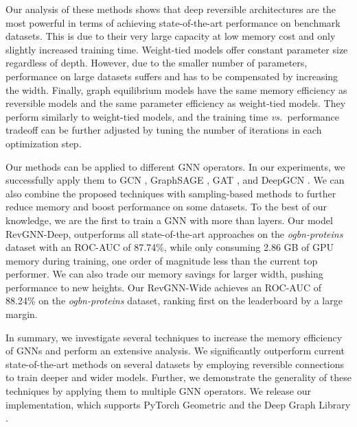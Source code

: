 \documentclass{article}
\newcommand{\vs}{\emph{vs.~}}
\begin{document}
Our analysis of these methods shows that deep reversible architectures are the most powerful in terms of achieving state-of-the-art performance on benchmark datasets. This is due to their very large capacity at low memory cost and only slightly increased training time. 
Weight-tied models offer constant parameter size regardless of depth.
However, due to the smaller number of parameters, performance on large datasets suffers and has to be compensated by increasing the width. Finally, graph equilibrium models have the same memory efficiency as reversible models and the same parameter efficiency as weight-tied models. They perform similarly to weight-tied models, and the training time \vs performance tradeoff can be further adjusted by tuning the number of iterations in each optimization step.

Our methods can be applied to different GNN operators. In our experiments, we successfully apply them to GCN \citep{kipf2017semi}, GraphSAGE \citep{hamilton2017inductive}, GAT \citep{veli2018gat}, and DeepGCN \citep{li2019deepgcns}. We can also combine the proposed techniques with sampling-based methods to further reduce memory and boost performance on some datasets.
To the best of our knowledge, we are the first to train a GNN with more than  layers. Our model RevGNN-Deep, outperforms all state-of-the-art approaches on the \emph{ogbn-proteins} dataset \citep{hu2020open} with an ROC-AUC of 87.74\%, while only consuming 2.86 GB of GPU memory during training, one order of magnitude less than the current top performer. We can also trade our memory savings for larger width, pushing performance to new heights. Our RevGNN-Wide achieves an ROC-AUC of 88.24\% on the \emph{ogbn-proteins} dataset, ranking first on the leaderboard by a large margin. 

In summary, we investigate several techniques to increase the memory efficiency of GNNs and perform an extensive analysis. We significantly outperform current state-of-the-art methods on several datasets by employing reversible connections to train deeper and wider models. Further, we demonstrate the generality of these techniques by applying them to multiple GNN operators. We release our implementation, which supports PyTorch Geometric \citep{Fey/Lenssen/2019} and the Deep Graph Library 
\citep{wang2019dgl}.
\end{document}
